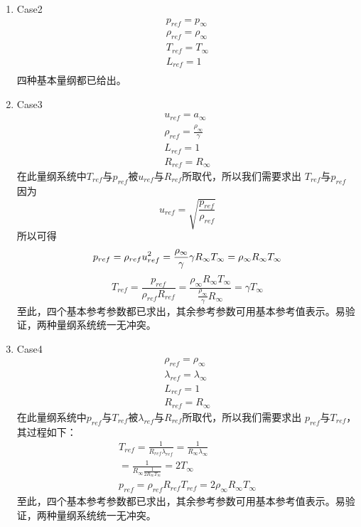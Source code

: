 \documentclass[a4paper,11pt]{article}
\begin{document}
\begin{enumerate}
    \item {Case2} \\
        \begin{eqnarray}
            p_{ref} = p_{\infty} \\
            \rho_{ref} = \rho_{\infty} \\
            T_{ref} = T_{\infty} \\
            L_{ref} = 1 \\
        \end{eqnarray}
        四种基本量纲都已给出。
    \item {Case3} \\
        \begin{eqnarray}
            u_{ref} = a_{\infty} \\
            \rho_{ref} = \frac{\rho_{\infty}}{\gamma} \\
            L_{ref} = 1 \\
            R_{ref} = R_{\infty}
        \end{eqnarray}
        在此量纲系统中$T_{ref}$与$p_{ref}$被$u_{ref}$与$R_{ref}$所取代，所以我们需要求出
        $T_{ref}$与$p_{ref}$
        因为
        \begin{equation}
            u_{ref} = \sqrt{\frac{p_{ref}}{\rho_{ref}}}
        \end{equation}
        所以可得
        \begin{equation}
            p_{ref} = \rho_{ref}u_{ref}^2 = \frac{\rho_{\infty}}{\gamma}\gamma R_{\infty}T_{\infty}\\
            =\rho_{\infty}R_{\infty}T_{\infty}
        \end{equation}
        \begin{equation}
            T_{ref}=\frac{p_{ref}}{\rho_{ref}R_{ref}}=\frac{\rho_{\infty}R_{\infty}T_{\infty}}{\frac{\rho_{\infty}}{\gamma}R_{\infty}}
            =\gamma T_{\infty}
        \end{equation}
        至此，四个基本参考参数都已求出，其余参考参数可用基本参考值表示。易验证，两种量纲系统统一无冲突。
    \item {Case4} \\
        \begin{eqnarray}
            \rho_{ref} = \rho_{\infty} \\
            \lambda_{ref} = \lambda_{\infty} \\
            L_{ref} = 1 \\
            R_{ref} = R_{\infty}
        \end{eqnarray}
        在此量纲系统中$p_{ref}$与$T_{ref}$被$\lambda_{ref}$与$R_{ref}$所取代，所以我们需要求出
        $p_{ref}$与$T_{ref}$，其过程如下：
        \begin{eqnarray}
            T_{ref}=\frac{1}{R_{ref}\lambda_{ref}}=\frac{1}{R_{\infty}\lambda_{\infty}} \\
            = \frac{1}{R_{\infty}\frac{1}{2R_{\infty}T_{\infty}}}=2T_{\infty}\\
            p_{ref}=\rho_{ref}R_{ref}T_{ref}=2\rho_{\infty}R_{\infty}T_{\infty}
        \end{eqnarray}
        至此，四个基本参考参数都已求出，其余参考参数可用基本参考值表示。易验证，两种量纲系统统一无冲突。

\end{enumerate}
\end{document}
